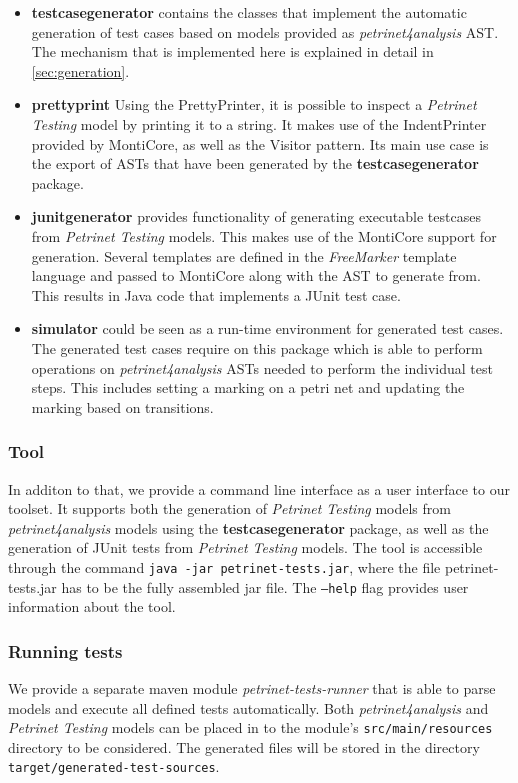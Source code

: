 \begin{itemize}
	\item \textbf{testcasegenerator} contains the classes that implement the automatic generation of test cases based on models provided as \emph{petrinet4analysis} AST. The mechanism that is implemented here is explained in detail in \ref{sec:generation}.
	\item \textbf{prettyprint} Using the PrettyPrinter, it is possible to inspect a \emph{Petrinet Testing} model by printing it to a string. It makes use of the IndentPrinter provided by MontiCore, as well as the Visitor pattern. Its main use case is the export of ASTs that have been generated by the \textbf{testcasegenerator} package.
	\item \textbf{junitgenerator} provides functionality of generating executable testcases from \textit{Petrinet Testing} models. This makes use of the MontiCore support for generation. Several templates are defined in the \textit{FreeMarker} template language and passed to MontiCore along with the AST to generate from. This results in Java code that implements a JUnit test case.
	\item \textbf{simulator} could be seen as a run-time environment for generated test cases. The generated test cases require on this package which is able to perform operations on \emph{petrinet4analysis} ASTs needed to perform the individual test steps. This includes setting a marking on a petri net and updating the marking based on transitions.
\end{itemize}

\subsubsection{Tool} In additon to that, we provide a command line interface as a user interface to our toolset. It supports both the generation of \textit{Petrinet Testing} models from \textit{petrinet4analysis} models using the \textbf{testcasegenerator} package, as well as the generation of JUnit tests from \textit{Petrinet Testing} models. The tool is accessible through the command \texttt{java -jar petrinet-tests.jar}, where the file petrinet-tests.jar has to be the fully assembled jar file. The \texttt{--help} flag provides user information about the tool.

\subsubsection{Running tests}
We provide a separate maven module \textit{petrinet-tests-runner} that is able to parse models and execute all defined tests automatically. Both \textit{petrinet4analysis} and \textit{Petrinet Testing} models can be placed in to the module's \texttt{src/main/resources} directory to be considered. The generated files will be stored in the directory \texttt{target/generated-test-sources}.


